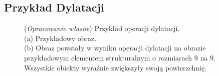 \documentclass{article}
\begin{document}
    \subsection{Przykład Dylatacji}
    \begin{figure}[H]
        \centering
        \qquad
        \caption
        {
            (\textit{Opracowanie własne}) Przykład operacji dylatacji.\\
            (a) Przykładowy obraz.\\
            (b) Obraz powstały w wyniku operacji dylatacji na obrazie przykładowym elementem strukturalnym o rozmiarach 9 na 9.
            Wszystkie obiekty wyraźnie zwiększyły swoją powierzchnię.
        }
    \end{figure}
\end{document}
